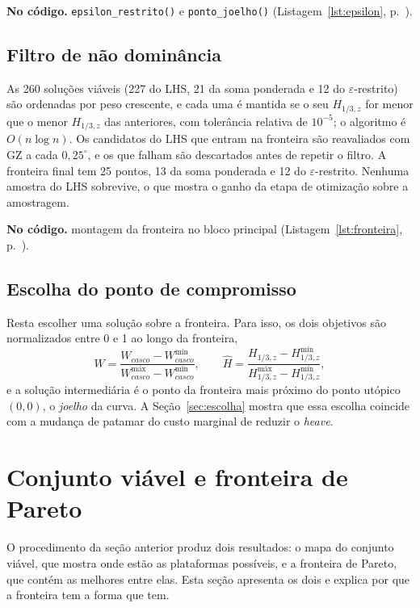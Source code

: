 \documentclass[11pt,a4paper]{article}
\newcommand{\notacodigo}[1]{\begin{nocodigo}\textbf{\sffamily\color{azul}No código.} #1\end{nocodigo}}
\newcommand{\lst}[1]{Listagem~\ref{lst:#1}, p.~\pageref{lst:#1}}
\newcommand{\Hz}{H_{1/3,z}}
\newcommand{\Wc}{W_{casco}}
\begin{document}
\notacodigo{\texttt{epsilon\_restrito()} e \texttt{ponto\_joelho()} (\lst{epsilon}).}

\subsection{Filtro de não dominância}

As 260 soluções viáveis (227 do LHS, 21 da soma ponderada e 12 do $\varepsilon$-restrito) são
ordenadas por peso crescente, e cada uma é mantida se o seu $\Hz$ for menor que o menor $\Hz$ das
anteriores, com tolerância relativa de $10^{-5}$; o algoritmo é $O(n\log n)$. Os candidatos do LHS
que entram na fronteira são reavaliados com GZ a cada $0{,}25^\circ$, e os que falham são
descartados antes de repetir o filtro. A fronteira final tem 25 pontos, 13 da soma ponderada e 12
do $\varepsilon$-restrito. Nenhuma amostra do LHS sobrevive, o que mostra o ganho da etapa de
otimização sobre a amostragem.

\notacodigo{montagem da fronteira no bloco principal (\lst{fronteira}).}

\subsection{Escolha do ponto de compromisso}\label{sec:joelho}

Resta escolher uma solução sobre a fronteira. Para isso, os dois objetivos são normalizados entre
0 e 1 ao longo da fronteira,
\begin{equation}
\hat W = \frac{\Wc - \Wc^{\text{mín}}}{\Wc^{\text{máx}} - \Wc^{\text{mín}}}, \qquad
\hat H = \frac{\Hz - \Hz^{\text{mín}}}{\Hz^{\text{máx}} - \Hz^{\text{mín}}},
\end{equation}
e a solução intermediária é o ponto da fronteira mais próximo do ponto utópico $(0, 0)$, o
\emph{joelho} da curva. A Seção~\ref{sec:escolha} mostra que essa escolha coincide com a mudança
de patamar do custo marginal de reduzir o \emph{heave}.


\section{Conjunto viável e fronteira de Pareto}\label{sec:pareto}

O procedimento da seção anterior produz dois resultados: o mapa do conjunto viável, que mostra
onde estão as plataformas possíveis, e a fronteira de Pareto, que contém as melhores entre elas.
Esta seção apresenta os dois e explica por que a fronteira tem a forma que tem.
\end{document}

